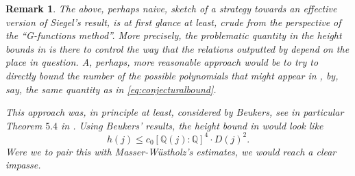 \documentclass[12pt,twoside,a4paper]{article}
\theoremstyle{plain}%
\newtheorem{remark}[theorem]{Remark}
\newcommand{\Q}{\mathbb{Q}}
\begin{document}
\begin{remark}The above, perhaps naive, sketch of a strategy towards an effective version of Siegel's result, is at first glance at least, crude from the perspective of the ``G-functions method''. More precisely, the problematic quantity in the height bounds in  is there to control the way that the relations outputted by  depend on the place in question. A, perhaps, more reasonable approach would be to try to directly bound the number of the possible polynomials that might appear in , by, say, the same quantity as in \eqref{eq:conjecturalbound}.

This approach was, in principle at least, considered by Beukers, see in particular Theorem $5.4$ in \cite{beukers}. Using Beukers' results, the height bound in  would look like \begin{equation}\label{eq:badheightbound}
	h(j)\leq c_0 [\Q(j):\Q]^4\cdot D(j)^2.
\end{equation}Were we to pair this with Masser-W\"ustholz's estimates, we would reach a clear impasse. \end{remark}

\appendix	




\end{document}
